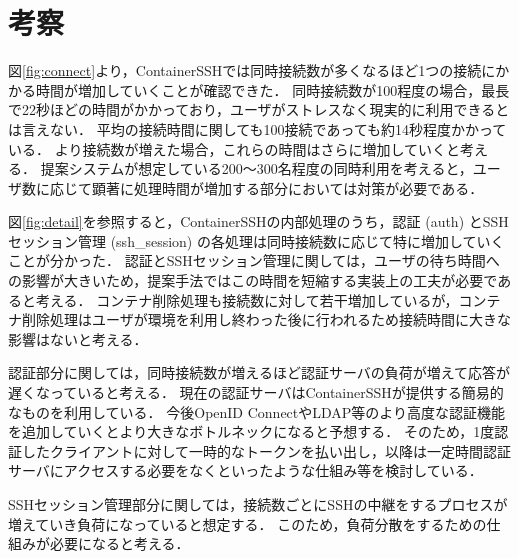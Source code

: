 \documentclass[dvipdfmx]{cs-handout}
\begin{document}
\section{考察}



図\ref{fig:connect}より，ContainerSSHでは同時接続数が多くなるほど1つの接続にかかる時間が増加していくことが確認できた．
同時接続数が100程度の場合，最長で22秒ほどの時間がかかっており，ユーザがストレスなく現実的に利用できるとは言えない．
平均の接続時間に関しても100接続であっても約14秒程度かかっている．
より接続数が増えた場合，これらの時間はさらに増加していくと考える．
提案システムが想定している200〜300名程度の同時利用を考えると，ユーザ数に応じて顕著に処理時間が増加する部分においては対策が必要である．


図\ref{fig:detail}を参照すると，ContainerSSHの内部処理のうち，認証 (auth) とSSHセッション管理 (ssh\_session) の各処理は同時接続数に応じて特に増加していくことが分かった．
認証とSSHセッション管理に関しては，ユーザの待ち時間への影響が大きいため，提案手法ではこの時間を短縮する実装上の工夫が必要であると考える．
コンテナ削除処理も接続数に対して若干増加しているが，コンテナ削除処理はユーザが環境を利用し終わった後に行われるため接続時間に大きな影響はないと考える．

認証部分に関しては，同時接続数が増えるほど認証サーバの負荷が増えて応答が遅くなっていると考える．
現在の認証サーバはContainerSSHが提供する簡易的なものを利用している．
今後OpenID ConnectやLDAP等のより高度な認証機能を追加していくとより大きなボトルネックになると予想する．
そのため，1度認証したクライアントに対して一時的なトークンを払い出し，以降は一定時間認証サーバにアクセスする必要をなくといったような仕組み等を検討している．


SSHセッション管理部分に関しては，接続数ごとにSSHの中継をするプロセスが増えていき負荷になっていると想定する．
このため，負荷分散をするための仕組みが必要になると考える．
\end{document}
